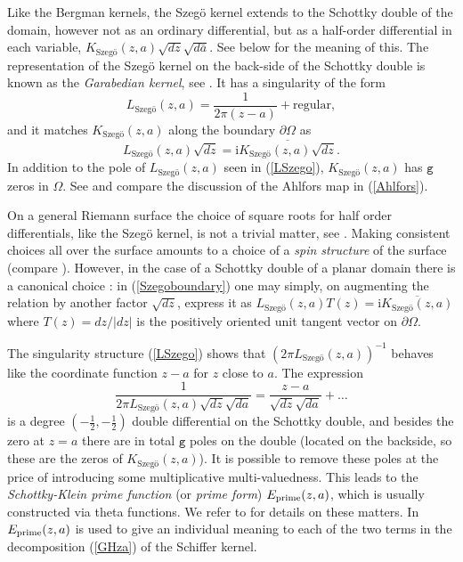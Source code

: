 \documentclass[reqno,12pt]{article}
\theoremstyle{plain}
\theoremstyle{definition}
\numberwithin{equation}{section}
\numberwithin{figure}{section}
\def\I{\mathrm{i}}
\begin{document}
Like the Bergman kernels, the Szeg\"o kernel extends to the Schottky double of the domain, however not as an ordinary differential,
but as a half-order differential in each variable, $K_\text{Szeg\"o}(z,a)\sqrt{dz}\sqrt{d\bar{a}}$. See below for the meaning of this.
The representation of the Szeg\"o kernel on the back-side of the Schottky double is known as the {\it Garabedian kernel}, see \cite{Bell-2016}.
It has a singularity of the form
\begin{equation}\label{LSzego}
L_\text{Szeg\"o}(z,a)=\frac{1}{2\pi(z-a)}+\text{regular},
\end{equation}
and it matches $K_{\text{Szeg\"o}}(z,a)$ along the boundary $\partial\Omega$ as
\begin{equation}\label{Szegoboundary}
L_\text{Szeg\"o}(z,a)\sqrt{dz}=\I \overline{K_\text{Szeg\"o}(z,a)\sqrt{d{z}}}.
\end{equation} 
In addition to the pole of $L_\text{Szeg\"o}(z,a)$ seen in (\ref{LSzego}),  $K_\text{Szeg\"o}(z,a)$ has $\texttt{g}$ zeros in $\Omega$.
See \cite{Bell-2016} and compare the discussion of the Ahlfors map in (\ref{Ahlfors}).

On a general Riemann surface the choice of square roots for half order differentials, like the Szeg\"o  kernel, is not a trivial matter,
see \cite{Hawley-Schiffer-1966, Gunning-1966}.
Making consistent choices all over the surface amounts to a choice of a {\it spin structure} of the surface (compare
\cite{Atiyah-1971}). However,  in the case of a Schottky double of a planar domain there is a canonical choice 
\cite{Hejhal-1972, Gustafsson-1987}: in (\ref{Szegoboundary}) one may simply, on augmenting the relation by another factor
$\sqrt{dz}$, express it as $L_\text{Szeg\"o}(z,a)T(z)=\I \overline{K_\text{Szeg\"o}(z,a)}$ 
where $T(z)=dz/|dz|$ is the positively oriented unit tangent vector on $\partial\Omega$.
 
The singularity structure (\ref{LSzego}) shows that $(2\pi L_\text{Szeg\"o}(z,a))^{-1}$ behaves
like the coordinate function $z-a$ for $z$ close to $a$. The expression
\begin{equation}\label{E}
\frac{1}{2\pi L_\text{Szeg\"o}(z,a){\sqrt{dz}\sqrt{da}}}=\frac{z-a}{\sqrt{dz}\sqrt{da}}+\dots
\end{equation}
is a degree $(-\frac{1}{2}, -\frac{1}{2})$ double differential on the Schottky double,
and besides the zero at $z=a$ there are in total $\texttt{g}$ poles on the double 
(located on the backside, so these are the zeros of $K_\text{Szeg\"o}(z,a)$).
It is possible to remove these poles at the price of introducing some multiplicative multi-valuedness.
This leads to the {\it Schottky-Klein prime function} (or {\it prime form}) ${E_{\rm prime}(z,a)}$,
which is usually constructed via theta functions.
We refer to \cite{Hejhal-1972, Fay-1973, Bogatyrev-2009, Crowdy-2010} for details on these matters.
In \cite{Hoker-2024} ${E_{\rm prime}(z,a)}$ is used to give an individual meaning to each of the two terms in the
decomposition (\ref{GHza}) of the Schiffer kernel.
\end{document}
